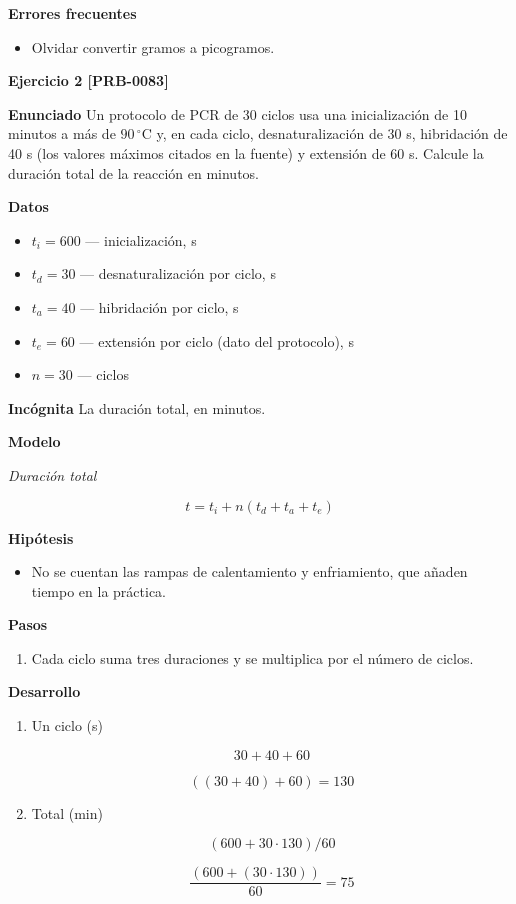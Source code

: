 \documentclass{book}
\begin{document}
\noindent\textbf{Errores frecuentes}
\begin{itemize}
\item Olvidar convertir gramos a picogramos.
\end{itemize}

\noindent\textbf{Ejercicio 2 [PRB-0083]}

\noindent\textbf{Enunciado}
Un protocolo de PCR de 30 ciclos usa una inicialización de 10 minutos a más de \(90\,{}^{\circ}\mathrm{C}\) y, en cada ciclo, desnaturalización de 30 s, hibridación de 40 s (los valores máximos citados en la fuente) y extensión de 60 s. Calcule la duración total de la reacción en minutos.


\noindent\textbf{Datos}
\begin{itemize}
\item $t_{i} = 600$ — inicialización, s
\item $t_{d} = 30$ — desnaturalización por ciclo, s
\item $t_{a} = 40$ — hibridación por ciclo, s
\item $t_{e} = 60$ — extensión por ciclo (dato del protocolo), s
\item $n = 30$ — ciclos
\end{itemize}

\noindent\textbf{Incógnita}
La duración total, en minutos.


\noindent\textbf{Modelo}

\noindent\textit{Duración total}

\[
t = t_i + n(t_d + t_a + t_e)
\]

\noindent\textbf{Hipótesis}
\begin{itemize}
\item No se cuentan las rampas de calentamiento y enfriamiento, que añaden tiempo en la práctica.
\end{itemize}

\noindent\textbf{Pasos}
\begin{enumerate}
\item
Cada ciclo suma tres duraciones y se multiplica por el número de ciclos.

\end{enumerate}

\noindent\textbf{Desarrollo}
\begin{enumerate}
\item
Un ciclo (s)


\[
30 + 40 + 60
\]

\[
\left(\left(30+40\right)+60\right) = 130
\]
\item
Total (min)


\[
(600 + 30\cdot130)/60
\]

\[
\frac{\left(600+\left(30\cdot 130\right)\right)}{60} = 75
\]
\end{enumerate}
\end{document}
